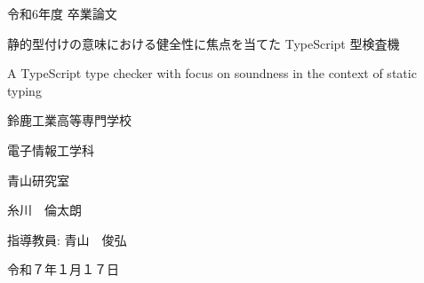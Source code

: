 \documentclass[
  luatex,
  paper=a4paper,
  fontsize=11pt,
  report,
  jlreq_notes,
]{jlreq}
\begin{document}
\begin{titlepage}
    \noindent
    \centering

    \vfill

    \LARGE{令和6年度 卒業論文}

    \vspace{10mm}

    \Huge{静的型付けの意味における健全性に焦点を当てた TypeScript 型検査機}

    \vspace{2mm}

    \LARGE{A TypeScript type checker with focus on soundness in the context of static typing}

    \vfill

    \Large{鈴鹿工業高等専門学校}

    \Large{電子情報工学科}

    \Large{青山研究室}

    \vspace{5mm}

    \LARGE{糸川　倫太朗}

    \vfill

    \Large{指導教員: 青山　俊弘}

    \vspace{2mm}

    \Large{令和７年１月１７日}
\end{titlepage}



\tableofcontents

\clearpage




\end{document}
